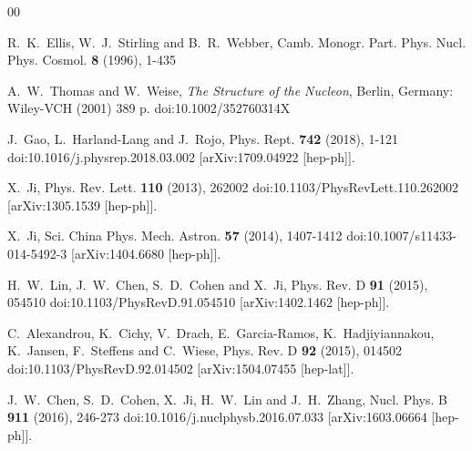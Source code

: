 \documentclass[preprint,12pt]{elsarticle}
\begin{document}
%
%

\begin{thebibliography}{00}

R.~K.~Ellis, W.~J.~Stirling and B.~R.~Webber,
Camb. Monogr. Part. Phys. Nucl. Phys. Cosmol. \textbf{8} (1996), 1-435

A.~W.~Thomas and W.~Weise,
\emph{The Structure of the Nucleon}, Berlin, Germany: Wiley-VCH (2001) 389 p.
doi:10.1002/352760314X

J.~Gao, L.~Harland-Lang and J.~Rojo,
Phys. Rept. \textbf{742} (2018), 1-121
doi:10.1016/j.physrep.2018.03.002
[arXiv:1709.04922 [hep-ph]].

X.~Ji,
Phys. Rev. Lett. \textbf{110} (2013), 262002
doi:10.1103/PhysRevLett.110.262002
[arXiv:1305.1539 [hep-ph]].

X.~Ji,
Sci. China Phys. Mech. Astron. \textbf{57} (2014), 1407-1412
doi:10.1007/s11433-014-5492-3
[arXiv:1404.6680 [hep-ph]].

H.~W.~Lin, J.~W.~Chen, S.~D.~Cohen and X.~Ji,
Phys. Rev. D \textbf{91} (2015), 054510
doi:10.1103/PhysRevD.91.054510
[arXiv:1402.1462 [hep-ph]].

C.~Alexandrou, K.~Cichy, V.~Drach, E.~Garcia-Ramos, K.~Hadjiyiannakou, K.~Jansen, F.~Steffens and C.~Wiese,
Phys. Rev. D \textbf{92} (2015), 014502
doi:10.1103/PhysRevD.92.014502
[arXiv:1504.07455 [hep-lat]].

J.~W.~Chen, S.~D.~Cohen, X.~Ji, H.~W.~Lin and J.~H.~Zhang,
Nucl. Phys. B \textbf{911} (2016), 246-273
doi:10.1016/j.nuclphysb.2016.07.033
[arXiv:1603.06664 [hep-ph]].


\end{thebibliography}
\end{document}
